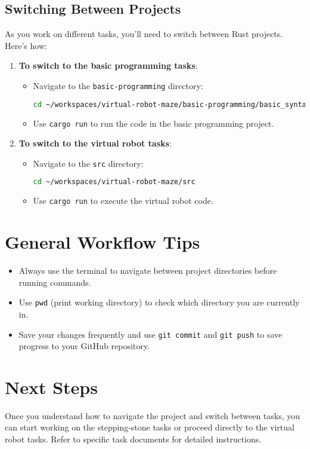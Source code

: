 \documentclass[12pt]{article}
\begin{document}
	\subsection*{Switching Between Projects}
	As you work on different tasks, you'll need to switch between Rust projects. Here’s how:
	\begin{enumerate}
		\item \textbf{To switch to the basic programming tasks}:
		\begin{itemize}
			\item Navigate to the \texttt{basic-programming} directory:
			\begin{lstlisting}[language=bash]
				cd ~/workspaces/virtual-robot-maze/basic-programming/basic_syntax
			\end{lstlisting}
			\item Use \texttt{cargo run} to run the code in the basic programming project.
		\end{itemize}
		
		\item \textbf{To switch to the virtual robot tasks}:
		\begin{itemize}
			\item Navigate to the \texttt{src} directory:
			\begin{lstlisting}[language=bash]
				cd ~/workspaces/virtual-robot-maze/src
			\end{lstlisting}
			\item Use \texttt{cargo run} to execute the virtual robot code.
		\end{itemize}
	\end{enumerate}
	
	\section*{General Workflow Tips}
	\begin{itemize}
		\item Always use the terminal to navigate between project directories before running commands.
		\item Use \texttt{pwd} (print working directory) to check which directory you are currently in.
		\item Save your changes frequently and use \texttt{git commit} and \texttt{git push} to save progress to your GitHub repository.
	\end{itemize}
	
	\section*{Next Steps}
	Once you understand how to navigate the project and switch between tasks, you can start working on the stepping-stone tasks or proceed directly to the virtual robot tasks. Refer to specific task documents for detailed instructions.
	
\end{document}
